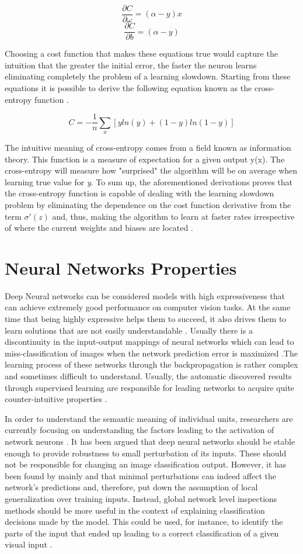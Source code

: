 \documentclass{article}
\begin{document}
$$\frac{\partial C}{\partial \omega} = (\alpha - y)x$$
$$\frac{\partial C}{\partial b} = (\alpha - y) $$

Choosing a cost function that makes these equations true would capture the intuition that the greater the initial error, the faster the neuron learns eliminating completely the problem of a learning slowdown. Starting from these equations it is possible to derive the following equation known as the cross-entropy function \cite{nielsen2016}.

$$C = -\frac{1}{n} \sum_{x}[ yln(y) + (1-y)ln(1-y) ]$$

The intuitive meaning of cross-entropy comes from a field known as information theory. This function is a measure of expectation for a given output y(x). The cross-entropy will measure how "surprised" the algorithm will be on average when learning true value for \textit{y}. To sum up, the aforementioned derivations proves that the cross-entropy function is capable of dealing with the learning slowdown problem by eliminating the dependence on the cost function derivative from the term $\sigma'(z)$ and, thus, making the algorithm to learn at faster rates irrespective of where the current weights and biases are located \cite{goodfellow2016_book}.
\section{Neural Networks Properties}\label{sec: nn_props}

Deep Neural networks can be considered models with high expressiveness that can achieve extremely good performance on computer vision tasks. At the same time that being highly expressive helps them to succeed, it also drives them to learn solutions that are not easily understandable \cite{szegedy2013}. Usually there is a discontinuity in the input-output mappings of neural networks which can lead to miss-classification of images when the network prediction error is maximized \cite{gu2014}.The learning process of these networks through the backpropagation is rather complex and sometimes difficult to understand. Usually, the automatic discovered results through supervised learning are responsible for leading networks to acquire quite counter-intuitive properties \cite{szegedy2013}.

In order to understand the semantic meaning of individual units, researchers are currently focusing on understanding the factors leading to the activation of network neurons \cite{szegedy2013}. It has been argued that deep neural networks should be stable enough to provide robustness to small perturbation of its inputs. These should not be responsible for changing an image classification output. However, it has been found by mainly \cite{goodfellow2014} and \cite{szegedy2013} that minimal perturbations can indeed affect the network's predictions and, therefore, put down the assumption of local generalization over training inputs. Instead, global network level inspections methods should be more useful in the context of explaining classification decisions made by the model. This could be used, for instance, to identify the parts of the input that ended up leading to a correct classification of a given visual input \cite{szegedy2013}.
\end{document}
